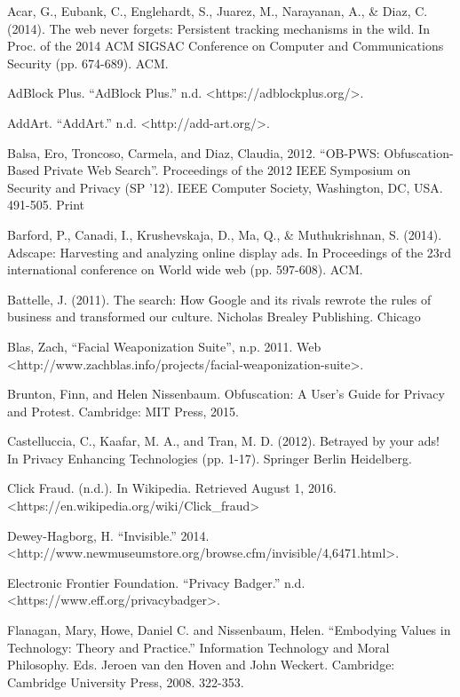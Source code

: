 \documentclass[conference]{IEEEtran}
\begin{document}
\begin{thebibliography}{99}

 Acar, G., Eubank, C., Englehardt, S., Juarez, M., Narayanan, A., \& Diaz, C. (2014). The web never forgets: Persistent tracking mechanisms in the wild. In Proc. of the 2014 ACM SIGSAC Conference on Computer and Communications Security (pp. 674-689). ACM.

 AdBlock Plus. ``AdBlock Plus.'' n.d. <https://adblockplus.org/>.

 AddArt. ``AddArt.'' n.d. <http://add-art.org/>.

 Balsa, Ero, Troncoso, Carmela, and Diaz, Claudia, 2012. ``OB-PWS: Obfuscation-Based Private Web Search''. Proceedings of the 2012 IEEE Symposium on Security and Privacy (SP '12). IEEE Computer Society, Washington, DC, USA. 491-505. Print

 Barford, P., Canadi, I., Krushevskaja, D., Ma, Q., \& Muthukrishnan, S. (2014). Adscape: Harvesting and analyzing online display ads. In Proceedings of the 23rd international conference on World wide web (pp. 597-608). ACM.

 Battelle, J. (2011). The search: How Google and its rivals rewrote the rules of business and transformed our culture. Nicholas Brealey Publishing.
Chicago

 Blas, Zach, ``Facial Weaponization Suite'', n.p. 2011. Web <http://www.zachblas.info/projects/facial-weaponization-suite>.

 Brunton, Finn, and Helen Nissenbaum. Obfuscation: A User's Guide for Privacy and Protest. Cambridge: MIT Press, 2015.

 Castelluccia, C., Kaafar, M. A., and Tran, M. D. (2012). Betrayed by your ads! In Privacy Enhancing Technologies (pp. 1-17). Springer Berlin Heidelberg.

 Click Fraud. (n.d.). In Wikipedia. Retrieved August 1, 2016. <https://en.wikipedia.org/wiki/Click\_fraud>

 Dewey-Hagborg, H. ``Invisible.'' 2014. <http://www.newmuseumstore.org/browse.cfm/invisible/4,6471.html>.

 Electronic Frontier Foundation. ``Privacy Badger.'' n.d. <https://www.eff.org/privacybadger>.

 Flanagan, Mary, Howe, Daniel C. and Nissenbaum, Helen. ``Embodying Values in Technology: Theory and Practice.'' Information Technology and Moral Philosophy. Eds. Jeroen van den Hoven and John Weckert. Cambridge: Cambridge University Press, 2008. 322-353.


\end{thebibliography}
\end{document}
